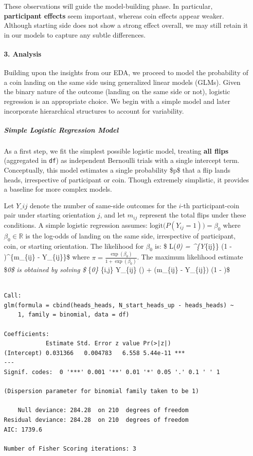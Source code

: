 \documentclass[
  letterpaper,
  DIV=11,
  numbers=noendperiod]{scrartcl}
\let\oldparagraph\paragraph
\renewcommand{\paragraph}[1]{\oldparagraph{#1}\mbox{}}
\let\oldsubparagraph\subparagraph
\renewcommand{\subparagraph}[1]{\oldsubparagraph{#1}\mbox{}}
\begin{document}
These observations will guide the model-building phase. In particular,
\textbf{participant effects} seem important, whereas coin effects appear
weaker. Although starting side does not show a strong effect overall, we
may still retain it in our models to capture any subtle differences.

\hypertarget{analysis}{%
\paragraph{\texorpdfstring{\textbf{3.
Analysis}}{3. Analysis}}\label{analysis}}

Building upon the insights from our EDA, we proceed to model the
probability of a coin landing on the same side using generalized linear
models (GLMs). Given the binary nature of the outcome (landing on the
same side or not), logistic regression is an appropriate choice. We
begin with a simple model and later incorporate hierarchical structures
to account for variability.

\hypertarget{simple-logistic-regression-model}{%
\subparagraph{Simple Logistic Regression
Model}\label{simple-logistic-regression-model}}

As a first step, we fit the simplest possible logistic model, treating
\textbf{all flips} (aggregated in \texttt{df}) as independent Bernoulli
trials with a single intercept term. Conceptually, this model estimates
a single probability \$p\$ that a flip lands heads, irrespective of
participant or coin. Though extremely simplistic, it provides a baseline
for more complex models.

Let \(Y\_{ij}\) denote the number of same-side outcomes for the \(i\)-th
participant-coin pair under starting orientation \(j\), and let
\(m_{ij}\) represent the total flips under these conditions. A simple
logistic regression assumes:
\(\text{logit}\bigl(P(Y_{ij} = 1)\bigr) = \beta_0\) where
\(\beta_0 \in \mathbb{R}\) is the log-odds of landing on the same side,
irrespective of participant, coin, or starting orientation. The
likelihood for \(\beta_0\) is: \$ L(\beta\emph{0) =
 \pi\^{}\{Y}\{ij\}\} (1 - \pi)\^{}\{m\_\{ij\} -
Y\_\{ij\}\}\$ where \(\pi = \frac{\exp(\beta_0)}{1 + \exp(\beta_0)}\).
The maximum likelihood estimate \$\hat{\beta}\emph{0\$ is obtained by
solving \$ \max}\{\beta\emph{0\} \sum}\{i,j\} Y\_\{ij\} \log(\pi) +
(m\_\{ij\} - Y\_\{ij\}) \log(1 - \pi)\$

\begin{verbatim}

Call:
glm(formula = cbind(heads_heads, N_start_heads_up - heads_heads) ~ 
    1, family = binomial, data = df)

Coefficients:
            Estimate Std. Error z value Pr(>|z|)    
(Intercept) 0.031366   0.004783   6.558 5.44e-11 ***
---
Signif. codes:  0 '***' 0.001 '**' 0.01 '*' 0.05 '.' 0.1 ' ' 1

(Dispersion parameter for binomial family taken to be 1)

    Null deviance: 284.28  on 210  degrees of freedom
Residual deviance: 284.28  on 210  degrees of freedom
AIC: 1739.6

Number of Fisher Scoring iterations: 3
\end{verbatim}
\end{document}
